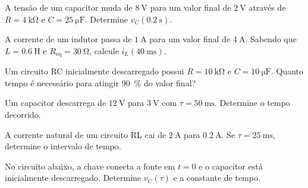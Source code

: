 \gabarito[Nível 1]

\blocoaplicacao
\begin{questao}[2]{}

A tensão de um capacitor muda de $\SI{8}{\volt}$ para um valor final de
$\SI{2}{\volt}$ através de $R=\SI{4}{\kilo\ohm}$ e
$C=\SI{25}{\micro\farad}$. Determine $v_C(\SI{0.2}{\second})$.


\end{questao}
\begin{questao}[2]{}

A corrente de um indutor passa de $\SI{1}{\ampere}$ para um valor final de
$\SI{4}{\ampere}$. Sabendo que $L=\SI{0.6}{\henry}$ e
$R_{\mathrm{eq}}=\SI{30}{\ohm}$, calcule $i_L(\SI{40}{\milli\second})$.


\end{questao}
\begin{questao}[2]{}

Um circuito RC inicialmente descarregado possui $R=\SI{10}{\kilo\ohm}$ e
$C=\SI{10}{\micro\farad}$. Quanto tempo é necessário para atingir
\SI{90}{\percent} do valor final?


\end{questao}
\begin{questao}[2]{}

Um capacitor descarrega de $\SI{12}{\volt}$ para $\SI{3}{\volt}$ com
$\tau=\SI{50}{\milli\second}$. Determine o tempo decorrido.


\end{questao}
\begin{questao}[2]{}

A corrente natural de um circuito RL cai de $\SI{2}{\ampere}$ para
$\SI{0.2}{\ampere}$. Se $\tau=\SI{25}{\milli\second}$, determine o intervalo de
tempo.


\end{questao}
\begin{questao}[2]{}

No circuito abaixo, a chave conecta a fonte em $t=0$ e o capacitor está
inicialmente descarregado. Determine $v_C(\tau)$ e a constante de tempo.




\end{questao}
